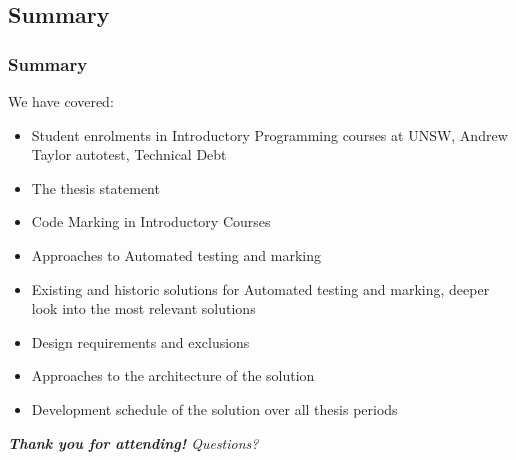 \documentclass[xcolor]{beamer}
\begin{document}
\subsection{Summary}
\begin{frame}
	\frametitle{Summary}
	We have covered:
	\begin{itemize}
		\item Student enrolments in Introductory Programming courses at UNSW, Andrew Taylor autotest, Technical Debt
			\pause
		\item The thesis statement
			\pause
		\item Code Marking in Introductory Courses
			\pause
		\item Approaches to Automated testing and marking
			\pause
		\item Existing and historic solutions for Automated testing and marking, deeper look into the most relevant solutions
			\pause
		\item Design requirements and exclusions
			\pause
		\item Approaches to the architecture of the solution
			\pause
		\item Development schedule of the solution over all thesis periods
			\pause
	\end{itemize}
	\textit{\textbf{Thank you for attending!} Questions?}
\end{frame}
\end{document}

